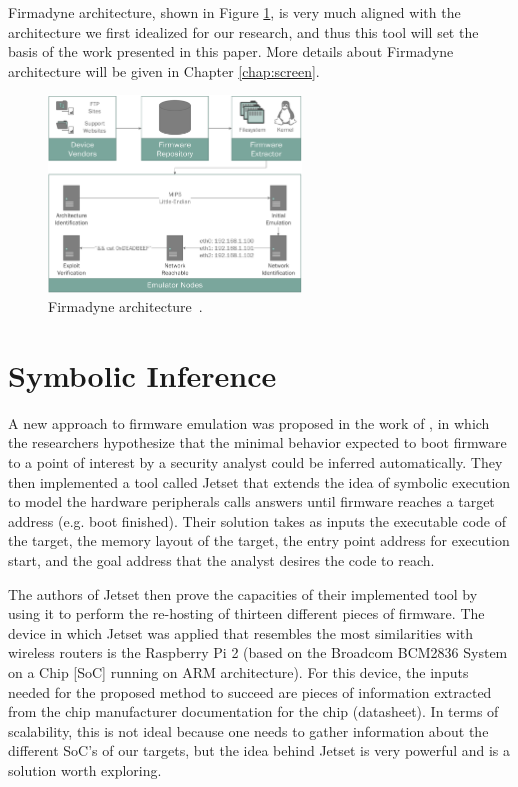 Firmadyne architecture, shown in Figure \ref{fig:firmadyne}, is very much aligned with the architecture we first idealized for our research, and thus this tool will set the basis of the work presented in this paper. More details about Firmadyne architecture will be given in Chapter \ref{chap:screen}.

\begin{figure}[H]
    \centering
    \includegraphics[width=0.6\textwidth]{figs/firmadyne.png}
    \caption{Firmadyne architecture~\cite{firmadyne}.}
    \label{fig:firmadyne}
\end{figure}

\section{Symbolic Inference}

A new approach to firmware emulation was proposed in the work of \cite{jetset}, in which the researchers hypothesize that the minimal behavior expected to boot firmware to a point of interest by a security analyst could be inferred automatically. They then implemented a tool called Jetset that extends the idea of symbolic execution to model the hardware peripherals calls answers until firmware reaches a target address (e.g. boot finished). Their solution takes as inputs the executable code of the target, the memory layout of the target, the entry point address for execution start, and the goal address that the analyst desires the code to reach.

The authors of Jetset then prove the capacities of their implemented tool by using it to perform the re-hosting of thirteen different pieces of firmware. The device in which Jetset was applied that resembles the most similarities with wireless routers is the Raspberry Pi 2 (based on the Broadcom BCM2836 System on a Chip [SoC] running on ARM architecture). For this device, the inputs needed for the proposed method to succeed are pieces of information extracted from the chip manufacturer documentation for the chip (datasheet). In terms of scalability, this is not ideal because one needs to gather information about the different SoC's of our targets, but the idea behind Jetset is very powerful and is a solution worth exploring.

